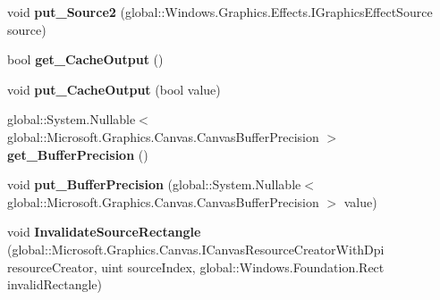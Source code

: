 \begin{DoxyCompactItemize}
void {\bfseries put\+\_\+\+Source2} (global\+::\+Windows.\+Graphics.\+Effects.\+I\+Graphics\+Effect\+Source source)
\item 
\mbox{\label{class_microsoft_1_1_graphics_1_1_canvas_1_1_effects_1_1_arithmetic_composite_effect_a4a8faa27b7f40cff2b8a4d59917a7fa6}} 
bool {\bfseries get\+\_\+\+Cache\+Output} ()
\item 
\mbox{\label{class_microsoft_1_1_graphics_1_1_canvas_1_1_effects_1_1_arithmetic_composite_effect_a41c8211f5c32f5e32af7fab7c98f6225}} 
void {\bfseries put\+\_\+\+Cache\+Output} (bool value)
\item 
\mbox{\label{class_microsoft_1_1_graphics_1_1_canvas_1_1_effects_1_1_arithmetic_composite_effect_a236603da73776f77972d52e595c0626f}} 
global\+::\+System.\+Nullable$<$ global\+::\+Microsoft.\+Graphics.\+Canvas.\+Canvas\+Buffer\+Precision $>$ {\bfseries get\+\_\+\+Buffer\+Precision} ()
\item 
\mbox{\label{class_microsoft_1_1_graphics_1_1_canvas_1_1_effects_1_1_arithmetic_composite_effect_aca2fb121403654ced1e4c0a762df80b6}} 
void {\bfseries put\+\_\+\+Buffer\+Precision} (global\+::\+System.\+Nullable$<$ global\+::\+Microsoft.\+Graphics.\+Canvas.\+Canvas\+Buffer\+Precision $>$ value)
\item 
\mbox{\label{class_microsoft_1_1_graphics_1_1_canvas_1_1_effects_1_1_arithmetic_composite_effect_a2e5a1ad13049cf4c774db94dcd6bc8d4}} 
void {\bfseries Invalidate\+Source\+Rectangle} (global\+::\+Microsoft.\+Graphics.\+Canvas.\+I\+Canvas\+Resource\+Creator\+With\+Dpi resource\+Creator, uint source\+Index, global\+::\+Windows.\+Foundation.\+Rect invalid\+Rectangle)
\item 
\mbox{\label{class_microsoft_1_1_graphics_1_1_canvas_1_1_effects_1_1_arithmetic_composite_effect_a54a5c115b7cdb1e7aa1feee764c415d7}} 

\end{DoxyCompactItemize}
